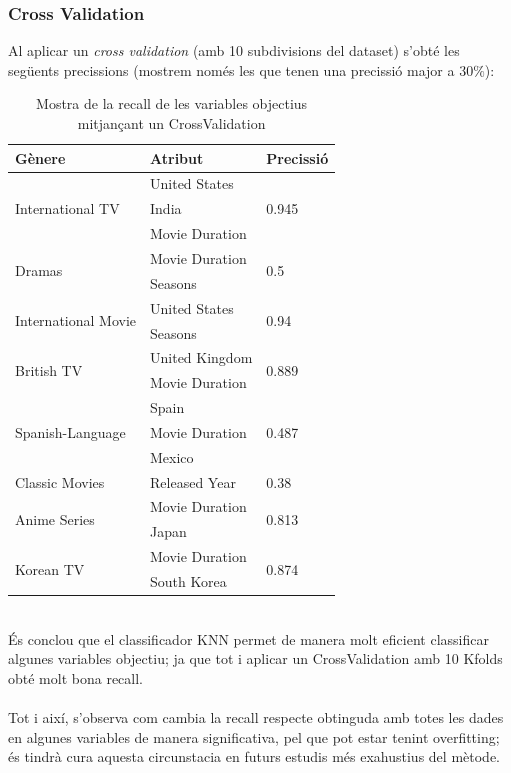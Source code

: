\documentclass[a4paper, 11pt]{article}
\begin{document}
\subsubsection{Cross Validation}
Al aplicar un \textit{cross validation} (amb 10 subdivisions del dataset) s'obté les següents precissions (mostrem només les que tenen una precissió major a $30\%$):
\begin{table}[h]
    \centering
    \begin{tabular}{l|l|l}
        \textbf{Gènere} & \textbf{Atribut} & \textbf{Precissió}\\\hline\hline
            \multirow{3}{*}{International TV} &  United States & \multirow{3}{*}{0.945} \\
            & India & \\
            & Movie Duration& \\ \hline
        \multirow{2}{*}{Dramas} &  Movie Duration & \multirow{2}{*}{0.5} \\ 
        & Seasons & \\\hline
        \multirow{2}{*}{International Movie} &  United States & \multirow{2}{*}{0.94} \\
            & Seasons & \\ \hline
        \multirow{2}{*}{British TV} &  United Kingdom & \multirow{2}{*}{0.889} \\
            & Movie Duration &  \\ \hline
        \multirow{3}{*}{Spanish-Language} &  Spain & \multirow{3}{*}{0.487} \\
            & Movie Duration & \\
            & Mexico & \\ \hline
        Classic Movies & Released Year & 0.38 \\ \hline
        \multirow{2}{*}{Anime Series} & Movie Duration & \multirow{2}{*}{0.813}\\
        & Japan & \\ \hline
        \multirow{2}{*}{Korean TV} & Movie Duration & \multirow{2}{*}{0.874}\\
        & South Korea & \\ 
        
    \end{tabular}
    \caption{Mostra de la recall de les variables objectius mitjançant un CrossValidation}
    \label{tab:my_label}
\end{table}\\
És conclou que el classificador KNN permet de manera molt eficient classificar algunes variables objectiu; ja que tot i aplicar un CrossValidation amb 10 Kfolds obté molt bona recall.\\\\
Tot i així, s'observa com cambia la recall respecte obtinguda amb totes les dades en algunes variables de manera significativa, pel que pot estar tenint overfitting; és tindrà cura aquesta circunstacia en futurs estudis més exahustius del mètode.\\\\
\end{document}
